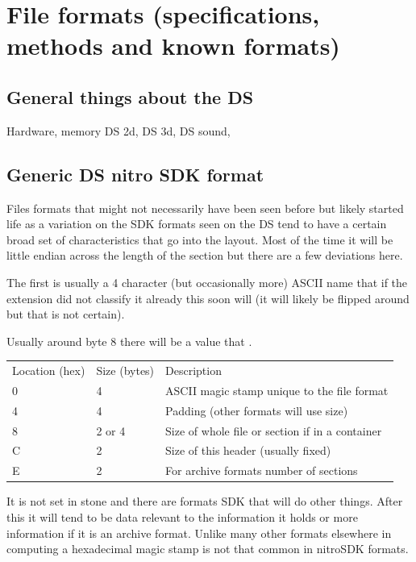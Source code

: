 \documentclass[
]{book}
\begin{document}
\hypertarget{part-file-formats-specifications-methods-and-known-formats}{%
\part{File formats (specifications, methods and known formats)}\label{part-file-formats-specifications-methods-and-known-formats}}

\hypertarget{general-things-about-the-ds}{%
\chapter{General things about the DS}\label{general-things-about-the-ds}}

Hardware, memory DS 2d, DS 3d, DS sound,

\hypertarget{generic-ds-nitro-sdk-format}{%
\chapter{Generic DS nitro SDK format}\label{generic-ds-nitro-sdk-format}}

Files formats that might not necessarily have been seen before but likely started life as a variation on the SDK formats seen on the DS tend to have a certain broad set of characteristics that go into the layout. Most of the time it will be little endian across the length of the section but there are a few deviations here.

The first is usually a 4 character (but occasionally more) ASCII name that if the extension did not classify it already this soon will (it will likely be flipped around but that is not certain).

Usually around byte 8 there will be a value that .

\begin{longtable}[]{@{}lll@{}}
\toprule()
\endhead
Location (hex) & Size (bytes) & Description \\
0 & 4 & ASCII magic stamp unique to the file format \\
4 & 4 & Padding (other formats will use size) \\
8 & 2 or 4 & Size of whole file or section if in a container \\
C & 2 & Size of this header (usually fixed) \\
E & 2 & For archive formats number of sections \\
\bottomrule()
\end{longtable}

It is not set in stone and there are formats SDK that will do other things. After this it will tend to be data relevant to the information it holds or more information if it is an archive format. Unlike many other formats elsewhere in computing a hexadecimal magic stamp is not that common in nitroSDK formats.
\end{document}
